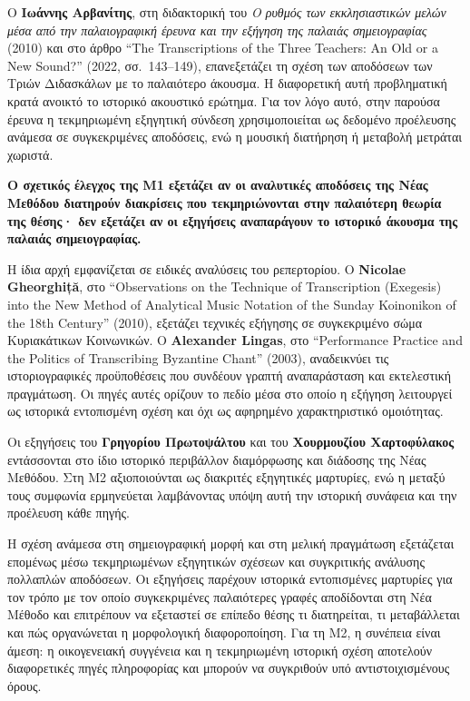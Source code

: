 \documentclass[11pt,a4paper]{article}
\begin{document}
Ο \textbf{Ιωάννης Αρβανίτης}, στη διδακτορική του \emph{Ο ρυθμός των εκκλησιαστικών μελών μέσα από την παλαιογραφική έρευνα και την εξήγηση της παλαιάς σημειογραφίας} (2010) και στο άρθρο ``The Transcriptions of the Three Teachers: An Old or a New Sound?'' (2022, σσ.~143--149), επανεξετάζει τη σχέση των αποδόσεων των Τριών Διδασκάλων με το παλαιότερο άκουσμα. Η διαφορετική αυτή προβληματική κρατά ανοικτό το ιστορικό ακουστικό ερώτημα. Για τον λόγο αυτό, στην παρούσα έρευνα η τεκμηριωμένη εξηγητική σύνδεση χρησιμοποιείται ως δεδομένο προέλευσης ανάμεσα σε συγκεκριμένες αποδόσεις, ενώ η μουσική διατήρηση ή μεταβολή μετράται χωριστά.

\textbf{Ο σχετικός έλεγχος της M1 εξετάζει αν οι αναλυτικές αποδόσεις της Νέας Μεθόδου διατηρούν διακρίσεις που τεκμηριώνονται στην παλαιότερη θεωρία της θέσης· δεν εξετάζει αν οι εξηγήσεις αναπαράγουν το ιστορικό άκουσμα της παλαιάς σημειογραφίας.}

Η ίδια αρχή εμφανίζεται σε ειδικές αναλύσεις του ρεπερτορίου. Ο \textbf{Nicolae Gheorghiță}, στο ``Observations on the Technique of Transcription (Exegesis) into the New Method of Analytical Music Notation of the Sunday Koinonikon of the 18th Century'' (2010), εξετάζει τεχνικές εξήγησης σε συγκεκριμένο σώμα Κυριακάτικων Κοινωνικών. Ο \textbf{Alexander Lingas}, στο ``Performance Practice and the Politics of Transcribing Byzantine Chant'' (2003), αναδεικνύει τις ιστοριογραφικές προϋποθέσεις που συνδέουν γραπτή αναπαράσταση και εκτελεστική πραγμάτωση. Οι πηγές αυτές ορίζουν το πεδίο μέσα στο οποίο η εξήγηση λειτουργεί ως ιστορικά εντοπισμένη σχέση και όχι ως αφηρημένο χαρακτηριστικό ομοιότητας.

Οι εξηγήσεις του \textbf{Γρηγορίου Πρωτοψάλτου} και του \textbf{Χουρμουζίου Χαρτοφύλακος} εντάσσονται στο ίδιο ιστορικό περιβάλλον διαμόρφωσης και διάδοσης της Νέας Μεθόδου. Στη M2 αξιοποιούνται ως διακριτές εξηγητικές μαρτυρίες, ενώ η μεταξύ τους συμφωνία ερμηνεύεται λαμβάνοντας υπόψη αυτή την ιστορική συνάφεια και την προέλευση κάθε πηγής.

Η σχέση ανάμεσα στη σημειογραφική μορφή και στη μελική πραγμάτωση εξετάζεται επομένως μέσω τεκμηριωμένων εξηγητικών σχέσεων και συγκριτικής ανάλυσης πολλαπλών αποδόσεων. Οι εξηγήσεις παρέχουν ιστορικά εντοπισμένες μαρτυρίες για τον τρόπο με τον οποίο συγκεκριμένες παλαιότερες γραφές αποδίδονται στη Νέα Μέθοδο και επιτρέπουν να εξεταστεί σε επίπεδο θέσης τι διατηρείται, τι μεταβάλλεται και πώς οργανώνεται η μορφολογική διαφοροποίηση. Για τη M2, η συνέπεια είναι άμεση: η οικογενειακή συγγένεια και η τεκμηριωμένη ιστορική σχέση αποτελούν διαφορετικές πηγές πληροφορίας και μπορούν να συγκριθούν υπό αντιστοιχισμένους όρους.
\end{document}
